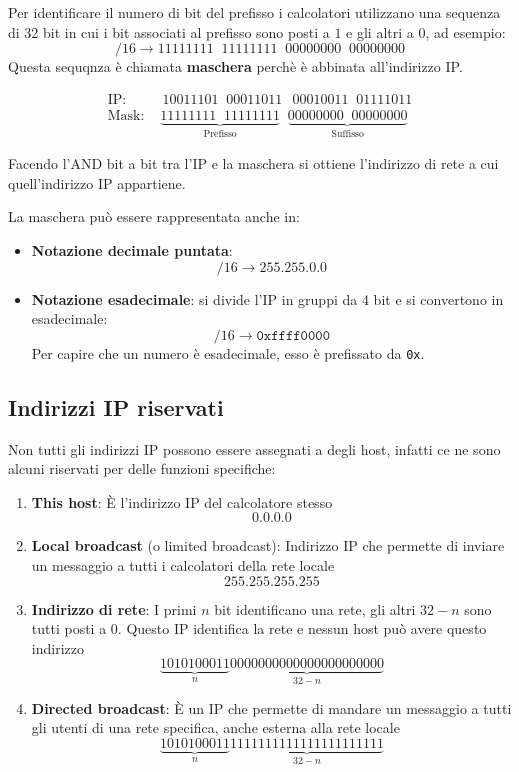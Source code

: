 \documentclass[a4paper]{article}
\begin{document}
\noindent
Per identificare il numero di bit del prefisso i calcolatori utilizzano una sequenza di
32 bit in cui i bit associati al prefisso sono posti a \( 1 \) e gli altri a \( 0 \),
ad esempio:
\[
/16 \to 11111111 \;\; 11111111 \;\; 00000000 \;\; 00000000
\] 
Questa sequqnza è chiamata \textbf{maschera} perchè è abbinata all'indirizzo IP.
\begin{example}
\[
  \begin{aligned}
    \text{IP: } & \,10011101 \;\; 00011011 \;\;\, 00010011 \;\; 01111011\\
    \text{Mask: }& \underbrace{11111111 \;\; 11111111}_{\text{Prefisso}} \;\; \underbrace{00000000 \;\; 00000000}_{\text{Suffisso}}
  \end{aligned}
\] 
\end{example}
Facendo l'AND bit a bit tra l'IP e la maschera si ottiene l'indirizzo di rete a cui
quell'indirizzo IP appartiene.

\vspace{1em}
\noindent
La maschera può essere rappresentata anche in:
\begin{itemize}
  \item \textbf{Notazione decimale puntata}:
    \[
      /16 \to 255.255.0.0
    \] 
  \item \textbf{Notazione esadecimale}: si divide l'IP in gruppi da 4 bit e si convertono
    in esadecimale:
    \[
      /16 \to \texttt{0xffff0000}
    \] 
    Per capire che un numero è esadecimale, esso è prefissato da \texttt{0x}.
\end{itemize}

\subsection{Indirizzi IP riservati}
Non tutti gli indirizzi IP possono essere assegnati a degli host, infatti ce ne sono alcuni
riservati per delle funzioni specifiche:
\begin{enumerate}
  \item \textbf{This host}: È l'indirizzo IP del calcolatore stesso
    \[
      0.0.0.0
    \] 
  \item \textbf{Local broadcast} (o limited broadcast): Indirizzo IP che permette di 
    inviare un messaggio a tutti i calcolatori della rete locale
    \[
      255.255.255.255
    \]
  \item \textbf{Indirizzo di rete}: I primi \( n \) bit identificano una rete, gli altri
    \( 32 - n \) sono tutti posti a 0. Questo IP identifica la rete e nessun host può
    avere questo indirizzo
    \[
      \underbrace{1010100011}_{n} \underbrace{0000000000000000000000}_{32-n}
    \] 
  \item \textbf{Directed broadcast}: È un IP che permette di mandare un messaggio a tutti
    gli utenti di una rete specifica, anche esterna alla rete locale
    \[
      \underbrace{1010100011}_{n} \underbrace{1111111111111111111111}_{32-n}
    \] 
\end{enumerate}
\end{document}
